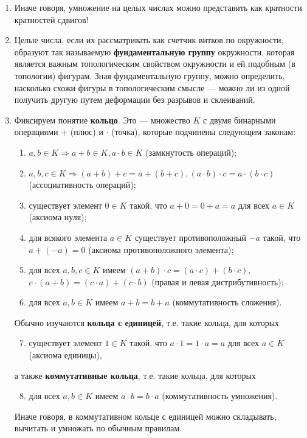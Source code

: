 \begin{enumerate}
\item Иначе говоря, умножение на целых числах можно представить как кратности кратностей сдвигов!
\item Целые числа, если их рассматривать как счетчик витков по окружности, образуют так называемую \textbf{фундаментальную группу} окружности, которая является важным топологическим свойством окружности и ей подобным (в топологии) фигурам. Зная фундаментальную группу, можно определить, насколько схожи фигуры в топологическим смысле --- можно ли из одной получить другую путем деформации без разрывов и склеиваний.
\item Фиксируем понятие \textbf{кольцо}. Это --- множество $K$ с двумя бинарными операциями $+$ (плюс) и $\cdot$ (точка), которые подчинены следующим законам:
\begin{enumerate}[R1)]
\item $a,b\in K\Rightarrow a+b\in K, a\cdot b\in K$ (замкнутость операций);
\item $a,b,c\in K\Rightarrow (a+b)+c=a+(b+c), (a\cdot b)\cdot c = a\cdot (b\cdot c)$ (ассоциативность операций);
\item существует элемент $0\in K$ такой, что $a+0=0+a=a$ для всех $a\in K$ (аксиома нуля);
\item для всякого элемента $a\in K$ существует противоположный $-a$ такой, что $a+(-a)=0$ (аксиома противоположного элемента);
\item для всех $a,b,c\in K$ имеем $(a+b)\cdot c=(a\cdot c)+(b\cdot c)$, $c\cdot(a+b)=(c\cdot a)+(c\cdot b)$ (правая и левая дистрибутивность);
\item для всех $a,b\in K$ имеем $a+b=b+a$ (коммутативность сложения).
\end{enumerate}

Обычно изучаются \textbf{кольца с единицей}, т.е. такие кольца, для которых
\begin{enumerate}[R1)]\setcounter{enumii}{6}
\item существует элемент $1\in K$ такой, что $a\cdot 1=1\cdot a=a$ для всех $a\in K$ (аксиома единицы),
\end{enumerate}
а также \textbf{коммутативные кольца}, т.е. такие кольца, для которых
\begin{enumerate}[R1)]\setcounter{enumii}{7}
\item для всех $a,b\in K$ имеем $a\cdot b=b\cdot a$ (коммутативность умножения).
\end{enumerate}

Иначе говоря, в коммутативном кольце с единицей можно складывать, вычитать и умножать по обычным правилам.
\end{enumerate}
